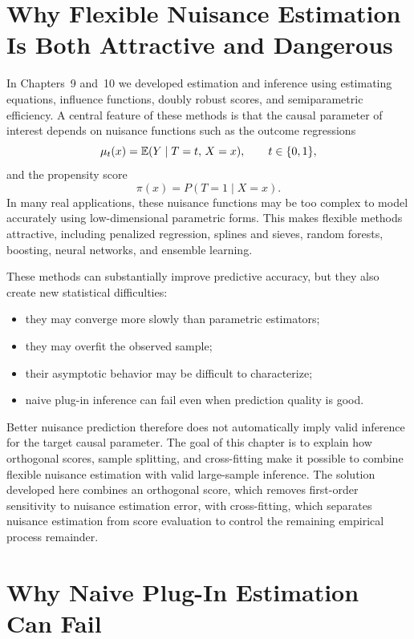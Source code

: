 \documentclass[master.tex]{subfiles}
\begin{document}
\section{Why Flexible Nuisance Estimation Is Both Attractive and Dangerous}
\label{w11:sec:motivation}

In Chapters~9 and~10 we developed estimation and inference using
estimating equations, influence functions, doubly robust scores, and
semiparametric efficiency.  A central feature of these methods is
that the causal parameter of interest depends on nuisance functions
such as the outcome regressions
\[
  \mu_t(x) = \mathbb{E}(Y \mid T=t,\, X=x), \qquad t \in \{0,1\},
\]
and the propensity score
\[
  \pi(x) = P(T=1 \mid X=x).
\]
In many real applications, these nuisance functions may be too
complex to model accurately using low-dimensional parametric forms.
This makes flexible methods attractive, including penalized
regression, splines and sieves, random forests, boosting, neural
networks, and ensemble learning.

These methods can substantially improve predictive accuracy, but they
also create new statistical difficulties:
\begin{itemize}
  \item they may converge more slowly than parametric estimators;
  \item they may overfit the observed sample;
  \item their asymptotic behavior may be difficult to characterize;
  \item naive plug-in inference can fail even when prediction quality
    is good.
\end{itemize}

Better nuisance prediction therefore does not automatically imply
valid inference for the target causal parameter.  The goal of this
chapter is to explain how orthogonal scores, sample splitting, and
cross-fitting make it possible to combine flexible nuisance
estimation with valid large-sample inference.  The solution
developed here combines an orthogonal score, which removes
first-order sensitivity to nuisance estimation error, with
cross-fitting, which separates nuisance estimation from score
evaluation to control the remaining empirical process remainder.


\section{Why Naive Plug-In Estimation Can Fail}
\label{w11:sec:plugin}
\end{document}
